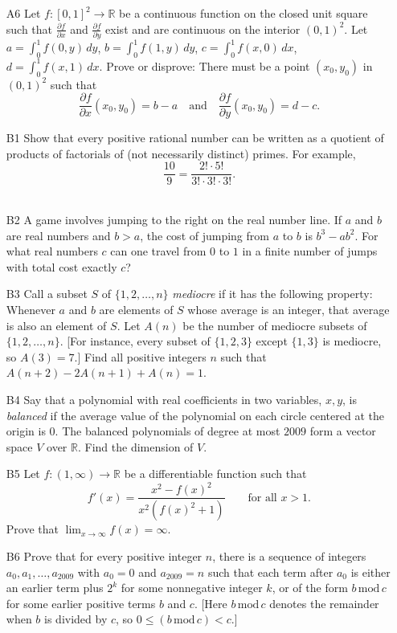 \documentclass[amssymb,twocolumn,pra,10pt,aps]{revtex4-1}
\begin{document}
\begin{itemize}
\item[A6]
Let $f:[0,1]^2 \to \mathbb{R}$ be a continuous function on the closed unit
square such that $\frac{\partial f}{\partial x}$ and $\frac{\partial f}{\partial y}$ exist
and are continuous on the interior $(0,1)^2$. Let $a = \int_0^1 f(0,y)\,dy$,
$b = \int_0^1 f(1,y)\,dy$, $c = \int_0^1 f(x,0)\,dx$, $d = \int_0^1 f(x,1)\,dx$.
Prove or disprove: There must be a point $(x_0,y_0)$ in $(0,1)^2$ such that
\[
\frac{\partial f}{\partial x} (x_0,y_0) = b - a
\quad \mbox{and} \quad
\frac{\partial f}{\partial y} (x_0,y_0) = d - c.
\]

\item[B1]
Show that every positive rational number can be written as a quotient of products of factorials
of (not necessarily distinct) primes. For example,
\[
\frac{10}{9} = \frac{2!\cdot 5!}{3!\cdot 3! \cdot 3!}.
\]
\,

\item[B2]
A game involves jumping to the right on the real number line. If $a$ and $b$ are real numbers
and $b > a$, the cost of jumping from $a$ to $b$ is $b^3-ab^2$. For what real numbers
$c$ can one travel from $0$ to $1$ in a finite number of jumps with total cost exactly $c$?

\item[B3]
Call a subset $S$ of $\{1, 2, \dots, n\}$ \emph{mediocre} if it has the following property:
Whenever $a$ and $b$ are elements of $S$ whose average is an integer, that average is also
an element of $S$. Let $A(n)$ be the number of mediocre subsets of $\{1,2,\dots,n\}$.
[For instance, every subset of $\{1,2,3\}$ except $\{1,3\}$ is mediocre, so $A(3) =7$.]
Find all positive integers $n$ such that $A(n+2) - 2A(n+1) + A(n) = 1$.

\item[B4]
Say that a polynomial with real coefficients in two variables, $x,y$, is \emph{balanced} if
the average value of the polynomial on each circle centered at the origin is $0$.
The balanced polynomials of degree at most $2009$ form a vector space $V$ over $\mathbb{R}$.
Find the dimension of $V$.

\item[B5]
Let $f: (1, \infty) \to \mathbb{R}$ be a differentiable function such that
\[
 f'(x) = \frac{x^2 - f(x)^2}{x^2 (f(x)^2 + 1)}
\qquad \mbox{for all $x>1$.}
\]
Prove that $\lim_{x \to \infty} f(x) = \infty$.

\item[B6]
Prove that for every positive integer $n$, there is a sequence of integers
$a_0, a_1, \dots, a_{2009}$ with $a_0 = 0$ and $a_{2009} = n$ such that each term
after $a_0$ is either an earlier term plus $2^k$ for some nonnegative integer $k$,
or of the form $b\,\mathrm{mod}\,c$ for some earlier positive terms $b$ and $c$.
[Here $b\,\mathrm{mod}\,c$ denotes the remainder when $b$ is divided by $c$,
so $0 \leq (b\,\mathrm{mod}\,c) < c$.]

\end{itemize}
\end{document}
